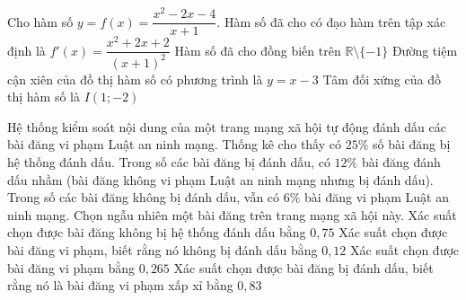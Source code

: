 \begin{ex}%
	Cho hàm số $y = f(x) = \dfrac{x^2 - 2x - 4}{x + 1}$.
	\choiceTF
	{\True Hàm số đã cho có đạo hàm trên tập xác định là $f'(x) = \dfrac{x^2 + 2x + 2}{(x+1)^2}$}
	{Hàm số đã cho đồng biến trên $\mathbb{R} \setminus \{-1\}$}
	{\True Đường tiệm cận xiên của đồ thị hàm số có phương trình là $y = x - 3$}
	{Tâm đối xứng của đồ thị hàm số là $I(1;-2)$}
\end{ex}


\begin{ex}%
	Hệ thống kiểm soát nội dung của một trang mạng xã hội tự động đánh dấu các bài đăng vi phạm Luật an ninh mạng. Thống kê cho thấy có $25\%$ số bài đăng bị hệ thống đánh dấu. Trong số các bài đăng bị đánh dấu, có $12\%$ bài đăng đánh dấu nhầm (bài đăng không vi phạm Luật an ninh mạng nhưng bị đánh dấu). Trong số các bài đăng không bị đánh dấu, vẫn có $6\%$ bài đăng vi phạm Luật an ninh mạng. Chọn ngẫu nhiên một bài đăng trên trang mạng xã hội này.
	\choiceTF
	{\True Xác suất chọn được bài đăng không bị hệ thống đánh dấu bằng $0{,}75$}
	{Xác suất chọn được bài đăng vi phạm, biết rằng nó không bị đánh dấu bằng $0{,}12$}
	{\True Xác suất chọn được bài đăng vi phạm bằng $0{,}265$}
	{\True Xác suất chọn được bài đăng bị đánh dấu, biết rằng nó là bài đăng vi phạm xấp xỉ bằng $0{,}83$}
\end{ex}


